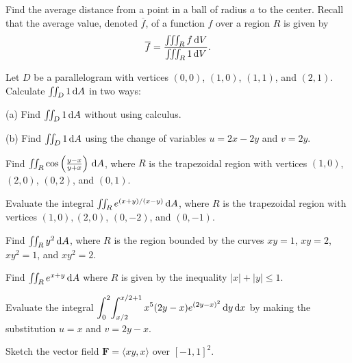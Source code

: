 \documentclass{watsonbook}
\begin{document}
\begin{aexercise}
  Find the average distance from a point in a ball of radius $a$ to
  the center. Recall that the average value, denoted $\overline{f}$,
  of a function $f$ over a region $R$ is given by
  \[
    \overline{f} = \frac{\iiint_R f \, {\mathrm{d}}V}{\iiint_R 1 \, {\mathrm{d}}V}.
  \]
\end{aexercise}



\begin{aexercise}
  Let $D$ be a parallelogram with vertices $(0,0)$, $(1,0)$, $(1,1)$,
  and $(2,1)$. Calculate $\iint_D 1\,\mathrm{d} A$ in two ways:

  (a) Find $\iint_D 1\,\mathrm{d} A$ without using calculus.

  (b) Find $\iint_D 1\,\mathrm{d} A$ using the change of variables $u = 2x - 2y$
  and $v=2y$.
\end{aexercise}

\begin{aexercise}
Find
$\iint_R \cos \left(\frac{y-x}{y+x}\right) \, {\mathrm{d}}A$, where $R$ is the
trapezoidal region with vertices $(1,0)$, $(2,0)$, $(0,2)$, and
$(0,1)$.
\end{aexercise}

\begin{aexercise}
  Evaluate the integral $\iint_R e^{(x+y)/(x-y)} \, {\mathrm{d}}A$, where $R$ is
  the trapezoidal region with vertices $(1,0), (2,0)$, $(0,-2)$, and
  $(0,-1)$.
\end{aexercise}

\begin{aexercise}
  Find $\iint_R y^2 \, {\mathrm{d}}A$, where $R$ is the region bounded by the
  curves $xy = 1$, $xy = 2$, $xy^2 = 1$, and $xy^2 = 2$.
\end{aexercise}

\begin{aexercise}
  Find $\iint_R e^{x+y} \, {\mathrm{d}}A$ where $R$ is given by the inequality
  $|x| + |y| \leq 1$.
\end{aexercise}

\begin{aexercise}
  Evaluate the integral
  $\displaystyle{\int_{0}^{2}\!\int_{x/2}^{x/2+1} x^5 (2y -
    x)e^{(2y-x)^2} \,\mathrm{d}y\,\mathrm{d}x}$ by making the substitution $u = x$ and
  $v=2y-x$.
\end{aexercise}


\begin{aexercise}
  Sketch the vector field $\mathbf{F} =\langle xy, x\rangle$ over
  $[-1,1]^2$. 
\end{aexercise}
\end{document}

